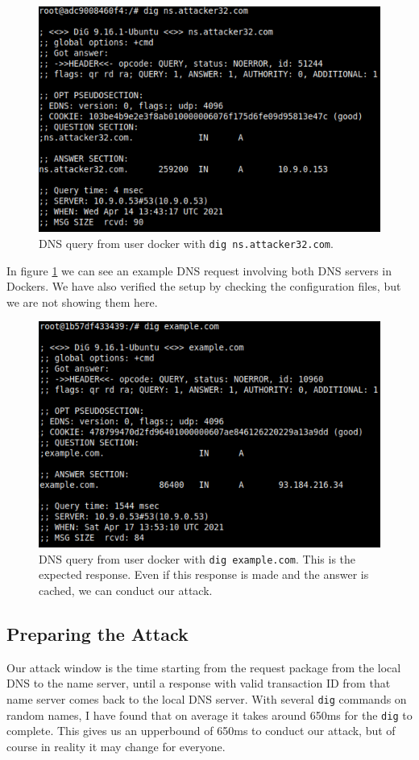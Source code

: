 \documentclass[12pt,reqno]{amsart}
\newcommand{\code}[1]{\texttt{#1}}
\begin{document}
\begin{figure}[h]
  \includegraphics[width=0.7\linewidth]{img/user_dig_nsattacker.png}
  \caption{DNS query from user docker with \code{dig ns.attacker32.com}.}
  \label{fig:atker}
\end{figure}

In figure \ref{fig:atker} we can see an example DNS request involving both DNS servers in Dockers. We have also verified the setup by checking the configuration files, but we are not showing them here.

\begin{figure}[h]
  \includegraphics[width=0.7\linewidth]{img/HONEST.png}
  \caption{DNS query from user docker with \code{dig example.com}. This is the expected response. Even if this response is made and the answer is cached, we can conduct our attack.}
  \label{fig:honest}
\end{figure}

\subsection*{Preparing the Attack}
Our attack window is the time starting from the request package from the local DNS to the name server, until a response with valid transaction ID from that name server comes back to the local DNS server. With several \code{dig} commands on random names, I have found that on average it takes around 650ms for the \code{dig} to complete. This gives us an upperbound of 650ms to conduct our attack, but of course in reality it may change for everyone.
\end{document}
